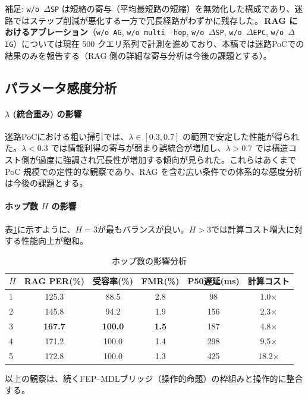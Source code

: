 \documentclass[ja=standard,xelatex]{bxjsarticle}
\begin{document}
\noindent 補足: \texttt{w/o $\Delta$SP} は短絡の寄与（平均最短路の短縮）を無効化した構成であり、迷路ではステップ削減が悪化する一方で冗長経路がわずかに残存した。\,\textbf{RAG におけるアブレーション}（\texttt{w/o AG}, \texttt{w/o multi\,\mbox{-}hop}, \texttt{w/o $\Delta$SP}, \texttt{w/o $\Delta$EPC}, \texttt{w/o $\Delta$IG}）については現在 500 クエリ系列で計測を進めており、本稿では迷路PoCでの結果のみを報告する（RAG 側の詳細な寄与分析は今後の課題とする）。

\subsection{パラメータ感度分析}

\paragraph{$\lambda$ (統合重み) の影響}
迷路PoCにおける粗い掃引では、$\lambda \in [0.3, 0.7]$ の範囲で安定した性能が得られた。$\lambda < 0.3$ では情報利得の寄与が弱まり誤統合が増加し、$\lambda > 0.7$ では構造コスト側が過度に強調され冗長性が増加する傾向が見られた。これらはあくまで PoC 規模での定性的な観察であり、RAG を含む広い条件での体系的な感度分析は今後の課題とする。

\paragraph{ホップ数 $H$ の影響}
表\ref{tab:hop_sensitivity}に示すように、$H=3$が最もバランスが良い。$H>3$では計算コスト増大に対する性能向上が飽和。

\begin{table}[H]
\centering
\caption{ホップ数の影響分析}
\label{tab:hop_sensitivity}
\begin{tabular}{lccccc}
\toprule
$H$ & RAG PER(\%) & 受容率(\%) & FMR(\%) & P50遅延(ms) & 計算コスト \\
\midrule
1 & 125.3 & 88.5 & 2.8 & 98 & 1.0× \\
2 & 145.8 & 94.2 & 1.9 & 156 & 2.3× \\
3 & \textbf{167.7} & \textbf{100.0} & \textbf{1.5} & 187 & 4.8× \\
4 & 171.2 & 100.0 & 1.4 & 298 & 9.5× \\
5 & 172.8 & 100.0 & 1.3 & 425 & 18.2× \\
\bottomrule
\end{tabular}
\end{table}

\noindent 以上の観察は、続くFEP–MDLブリッジ（操作的命題）の枠組みと操作的に整合する。
\end{document}
